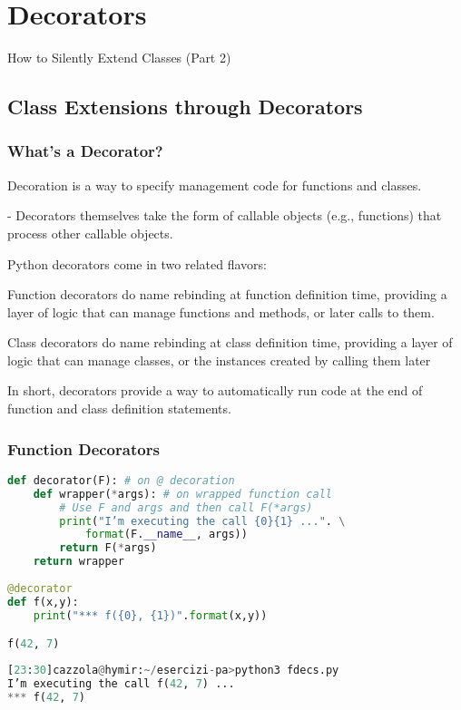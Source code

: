  \section{Decorators}

How to Silently Extend Classes (Part 2)

\subsection{Class Extensions through Decorators}

\subsubsection{What’s a Decorator?}

Decoration is a way to specify management code for functions and classes.

- Decorators themselves take the form of callable objects (e.g., functions) that process other callable objects.

Python decorators come in two related flavors:

Function decorators do name rebinding at function definition time, providing a layer of logic that can manage functions and methods, or later calls to them.

Class decorators do name rebinding at class definition time, providing a layer of logic that can manage classes, or the instances created by calling them later

In short, decorators provide a way to automatically run code at the end of function and class definition statements.


\subsubsection{Function Decorators}

\begin{lstlisting}[language=Python]
def decorator(F): # on @ decoration
	def wrapper(*args): # on wrapped function call
		# Use F and args and then call F(*args)
		print("I’m executing the call {0}{1} ...". \
			format(F.__name__, args))
		return F(*args)
	return wrapper
	
@decorator
def f(x,y):
	print("*** f({0}, {1})".format(x,y))

f(42, 7)
\end{lstlisting}

\begin{lstlisting}[language=Python]
[23:30]cazzola@hymir:~/esercizi-pa>python3 fdecs.py
I’m executing the call f(42, 7) ...
*** f(42, 7)
\end{lstlisting}

